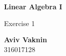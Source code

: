 \documentclass[a4paper, 12pt]{article}
\begin{document}
    \begin{center}
        \vspace*{4.4cm}
            
        \Huge
        \textbf{Linear Algebra I}
            
        \vspace{0.5cm}
        \LARGE
        Exercise 1

        \vfill
            
        \Large
        \textbf{Aviv Vaknin}\\316017128
                    
    \end{center}
\end{document}
